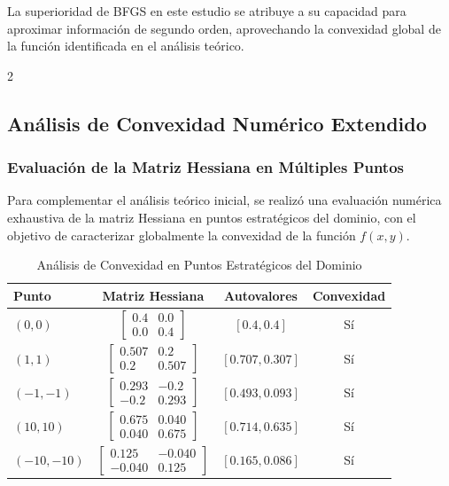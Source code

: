 \documentclass[11pt, a4paper, twocolumn]{beamer}
\begin{document}
\newpage
La superioridad de BFGS en este estudio se atribuye a su capacidad para aproximar información de segundo orden, aprovechando la convexidad global de la función identificada en el análisis teórico.
\newpage
\begin{multicols}{2}
	\subsection{Análisis de Convexidad Numérico Extendido}
	
	\subsubsection{Evaluación de la Matriz Hessiana en Múltiples Puntos}
	
	Para complementar el análisis teórico inicial, se realizó una evaluación numérica exhaustiva de la matriz Hessiana en puntos estratégicos del dominio, con el objetivo de caracterizar globalmente la convexidad de la función $f(x,y)$.
\end{multicols}
	\begin{table}[h]
		\centering
		\caption{Análisis de Convexidad en Puntos Estratégicos del Dominio}
		\begin{tabular}{lccc}
			\toprule
			\textbf{Punto} & \textbf{Matriz Hessiana} & \textbf{Autovalores} & \textbf{Convexidad} \\
			\midrule
			$(0,0)$ & 
			$\begin{bmatrix} 0.4 & 0.0 \\ 0.0 & 0.4 \end{bmatrix}$ & 
			$[0.4, 0.4]$ & 
			Sí \\
			$(1,1)$ & 
			$\begin{bmatrix} 0.507 & 0.2 \\ 0.2 & 0.507 \end{bmatrix}$ & 
			$[0.707, 0.307]$ & 
			Sí \\
			$(-1,-1)$ & 
			$\begin{bmatrix} 0.293 & -0.2 \\ -0.2 & 0.293 \end{bmatrix}$ & 
			$[0.493, 0.093]$ & 
			Sí \\
			$(10,10)$ & 
			$\begin{bmatrix} 0.675 & 0.040 \\ 0.040 & 0.675 \end{bmatrix}$ & 
			$[0.714, 0.635]$ & 
			Sí \\
			$(-10,-10)$ & 
			$\begin{bmatrix} 0.125 & -0.040 \\ -0.040 & 0.125 \end{bmatrix}$ & 
			$[0.165, 0.086]$ & 
			Sí \\
			\bottomrule
		\end{tabular}
	\end{table}
\end{document}
